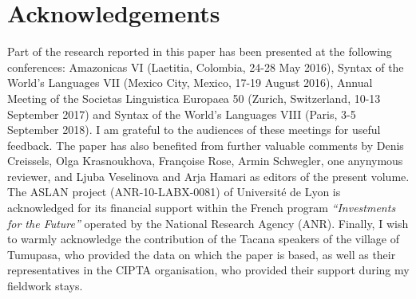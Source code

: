 \documentclass[output=paper]{langsci/langscibook}
\begin{document}
\section*{Acknowledgements}
Part of the research reported in this paper has been presented at the following conferences: Amazonicas VI (Laetitia, Colombia, 24-28 May 2016), Syntax of the World’s Languages VII (Mexico City, Mexico, 17-19 August 2016), Annual Meeting of the Societas Linguistica Europaea 50 (Zurich, Switzerland, 10-13 September 2017) and Syntax of the World's Languages VIII (Paris, 3-5 September 2018). I am grateful to the audiences of these meetings for useful feedback. The paper has also benefited from further valuable comments by Denis Creissels, Olga Krasnoukhova, Françoise Rose, Armin Schwegler, one anynymous reviewer, and Ljuba Veselinova and Arja Hamari as editors of the present volume. The ASLAN project (ANR-10-LABX-0081) of Université de Lyon is acknowledged for its financial support within the French program \textit{“Investments for the Future”} operated by the National Research Agency (ANR). Finally, I wish to warmly acknowledge the contribution of the Tacana speakers of the village of Tumupasa, who provided the data on which the paper is based, as well as their representatives in the CIPTA organisation, who provided their support during my fieldwork stays.

{\sloppy\printbibliography[heading=subbibliography,notkeyword=this]}
\end{document}
